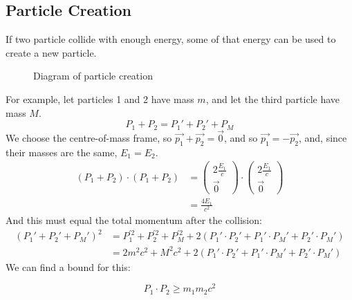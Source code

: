 \documentclass[../Main.tex]{subfiles}
\begin{document}
\subsection{Particle Creation}
If two particle collide with enough energy, some of that energy can be used to create a new particle.

\begin{figure}[ht]
    \centering
    \begin{tikzpicture}
        
    \end{tikzpicture}
    \caption{Diagram of particle creation}
    \label{figParticleCreation}
\end{figure}
For example, let particles 1 and 2 have mass $m$, and let the third particle have mass $M$.
\begin{equation*}
    P_1 + P_2 = P_1' + P_2' + P_M
\end{equation*}
We choose the centre-of-mass frame, so $\vec{p_1} + \vec{p_2} = \vec{0}$, and so $\vec{p_1} = - \vec{p_2}$, and, since their masses are the same, $E_1 = E_2$.
\begin{align*}
    (P_1 + P_2) \cdot (P_1 + P_2) &= \begin{pmatrix}2\frac{E_1}{c} \\ \vec{0}\end{pmatrix} \cdot \begin{pmatrix}2\frac{E_1}{c} \\ \vec{0}\end{pmatrix} \\
    &= \frac{4E_1}{c^2}
\end{align*}
And this must equal the total momentum after the collision:
\begin{align*}
    (P_1' + P_2' + P_M')^2 &= P_1^{\prime 2} + P_2^{\prime 2} + P_M^{\prime 2} + 2\left(P_1' \cdot P_2' + P_1' \cdot P_M' + P_2' \cdot P_M'\right) \\
    &= 2m^2 c^2 + M^2 c^2 + 2\left(P_1' \cdot P_2' + P_1' \cdot P_M' + P_2' \cdot P_M'\right)
\end{align*}
We can find a bound for this:
\begin{lemma}
    \begin{equation*}
        P_1 \cdot P_2 \geq m_1 m_2 c^2
    \end{equation*}
    \label{lemMomentumDotBound}
\end{lemma}
\end{document}
